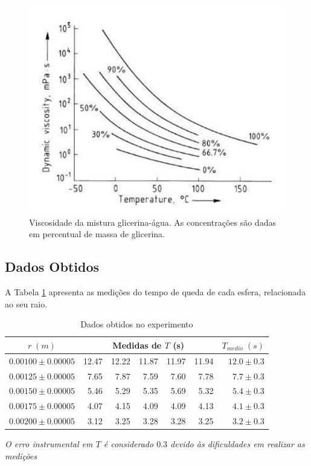 \documentclass[12pt,a4paper]{article}
\begin{document}
\begin{figure}[!htbp]
\centering
\includegraphics[scale=0.4]{Fig5-2.jpg}
\caption{Viscosidade da mistura glicerina-água. As concentrações
são dadas em percentual de massa de glicerina.}
\label{porcentagem}
\end{figure}

\subsection{Dados Obtidos}

A Tabela \ref{dados} apresenta as medições do tempo de queda de cada esfera, relacionada ao seu raio.

\begin{table}[!htbp]

\centering
\def\arraystretch{1.5}
\caption{Dados obtidos no experimento}

\begin{tabular}{|c|rrrrr|r|}
\hline
$ r \; (m)$ & \multicolumn{5}{c|}{Medidas de $T$ \;  (s)} & $T_{medio} \; (s)$  \\
\hline
  $ 0.00100 \pm 0.00005 $ &12.47 & 12.22 & 11.87 & 11.97 & 11.94 & $ 12.0 \pm 0.3 $ \\
  \hline
  $ 0.00125 \pm 0.00005 $ &7.65 & 7.87 & 7.59 & 7.60 & 7.78  & $ 7.7 \pm 0.3 $   \\
  \hline
  $ 0.00150 \pm 0.00005 $ &5.46 & 5.29 & 5.35 & 5.69 & 5.32 & $ 5.4 \pm 0.3 $     \\
  \hline
  $ 0.00175 \pm 0.00005 $ &4.07 & 4.15 & 4.09 & 4.09 & 4.13  & $ 4.1 \pm 0.3 $    \\
  \hline
  $ 0.00200 \pm 0.00005 $ &3.12 & 3.25 & 3.28 & 3.28 & 3.25 & $ 3.2 \pm 0.3 $       \\
\hline
\end{tabular}

\emph{O erro instrumental em $T$ é considerado $0.3$ devido às dificuldades em realizar as medições}
\label{dados}
\end{table}
\end{document}

